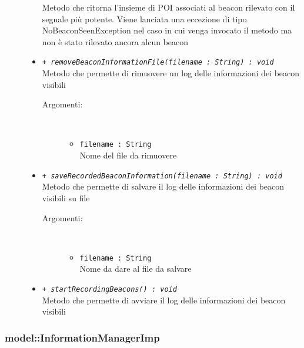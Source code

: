 \documentclass[../DefinizioneDiProdotto.tex]{subfiles}
\begin{document}
\begin{description}
\begin{itemize}
Metodo che ritorna l'insieme di POI associati al beacon rilevato con il segnale più potente. Viene lanciata una eccezione di tipo NoBeaconSeenException nel caso in cui venga invocato il metodo ma non è stato rilevato ancora alcun beacon
 \item \texttt{+ \textit{removeBeaconInformationFile(filename : String) : void}}\\
Metodo che permette di rimuovere un log delle informazioni dei beacon visibili
 \begin{description}
\item[Argomenti:] \
\begin{itemize}
\item \texttt{filename : String}\\
Nome del file da rimuovere\end{itemize}
\end{description}
\item \texttt{+ \textit{saveRecordedBeaconInformation(filename : String) : void}}\\
Metodo che permette di salvare il log delle informazioni dei beacon visibili su file
 \begin{description}
\item[Argomenti:] \
\begin{itemize}
\item \texttt{filename : String}\\
Nome da dare al file da salvare\end{itemize}
\end{description}
\item \texttt{+ \textit{startRecordingBeacons() : void}}\\
Metodo che permette di avviare il log delle informazioni dei beacon visibili
 \end{itemize}
\end{description}

\subsubsection{model::InformationManagerImp}
\end{document}
